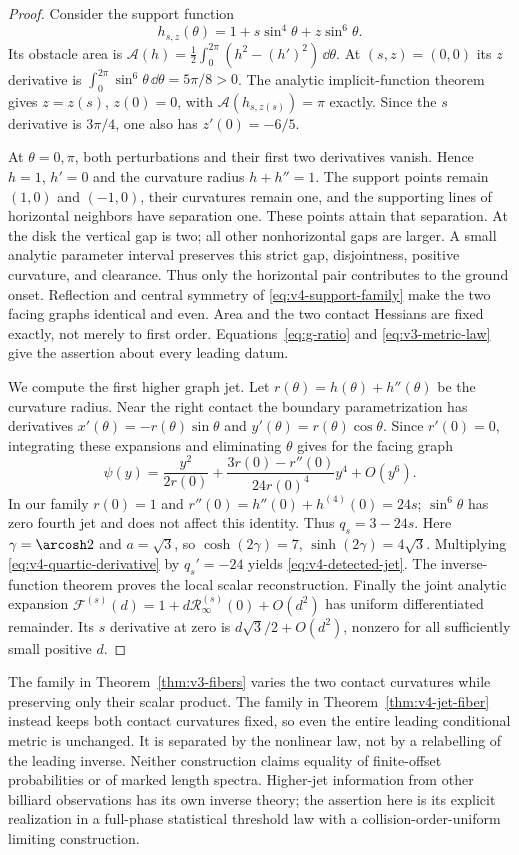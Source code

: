 \begin{proof}
Consider the support function
\begin{equation}\label{eq:v4-support-family}
 h_{s,z}(\theta)=1+s\sin^4\theta+z\sin^6\theta.
\end{equation}
Its obstacle area is
$\mathcal A(h)=\tfrac12\int_0^{2\pi}(h^2-(h')^2)\,\dd\theta$.
At $(s,z)=(0,0)$ its $z$ derivative is
$\int_0^{2\pi}\sin^6\theta\,\dd\theta=5\pi/8>0$.
The analytic implicit-function theorem gives $z=z(s)$, $z(0)=0$,
with $\mathcal A(h_{s,z(s)})=\pi$ exactly. Since the $s$ derivative
is $3\pi/4$, one also has $z'(0)=-6/5$.

At $\theta=0,\pi$, both perturbations and their first two derivatives
vanish. Hence $h=1$, $h'=0$ and the curvature radius $h+h''=1$.
The support points remain $(1,0)$ and $(-1,0)$, their curvatures
remain one, and the supporting lines of horizontal neighbors have
separation one. These points attain that separation. At the disk the
vertical gap is two; all other nonhorizontal gaps are larger. A small
analytic parameter interval preserves this strict gap, disjointness,
positive curvature, and clearance. Thus only the horizontal pair
contributes to the ground onset. Reflection and central symmetry of
\eqref{eq:v4-support-family} make the two facing graphs identical
and even. Area and the two contact Hessians are fixed exactly, not
merely to first order. Equations~\eqref{eq:g-ratio} and
\eqref{eq:v3-metric-law} give the assertion about every leading datum.

We compute the first higher graph jet. Let
$r(\theta)=h(\theta)+h''(\theta)$ be the curvature radius. Near the
right contact the boundary parametrization has derivatives
$x'(\theta)=-r(\theta)\sin\theta$ and
$y'(\theta)=r(\theta)\cos\theta$. Since $r'(0)=0$, integrating these
expansions and eliminating $\theta$ gives for the facing graph
\[
 \psi(y)=\frac{y^2}{2r(0)}+
          \frac{3r(0)-r''(0)}{24r(0)^4}y^4+O(y^6).
\]
In our family $r(0)=1$ and $r''(0)=h''(0)+h^{(4)}(0)=24s$;
$\sin^6\theta$ has zero fourth jet and does not affect this identity.
Thus $q_s=3-24s$. Here $\gamma=\arcosh2$ and $a=\sqrt3$, so
$\cosh(2\gamma)=7$, $\sinh(2\gamma)=4\sqrt3$.
Multiplying \eqref{eq:v4-quartic-derivative} by $q_s'=-24$ yields
\eqref{eq:v4-detected-jet}. The inverse-function theorem proves the
local scalar reconstruction. Finally the joint analytic expansion
$\mathcal F^{(s)}(d)=1+d\mathcal R_\infty^{(s)}(0)+O(d^2)$ has
uniform differentiated remainder. Its $s$ derivative at zero is
$d\sqrt3/2+O(d^2)$, nonzero for all sufficiently small positive $d$.
\end{proof}

The family in Theorem~\ref{thm:v3-fibers} varies the two contact
curvatures while preserving only their scalar product. The family in
Theorem~\ref{thm:v4-jet-fiber} instead keeps both contact curvatures
fixed, so even the entire leading conditional metric is unchanged.
It is separated by the nonlinear law, not by a relabelling of the
leading inverse. Neither construction claims equality of finite-offset
probabilities or of marked length spectra. Higher-jet information from
other billiard observations has its own inverse theory; the assertion
here is its explicit realization in a full-phase statistical threshold
law with a collision-order-uniform limiting construction.

